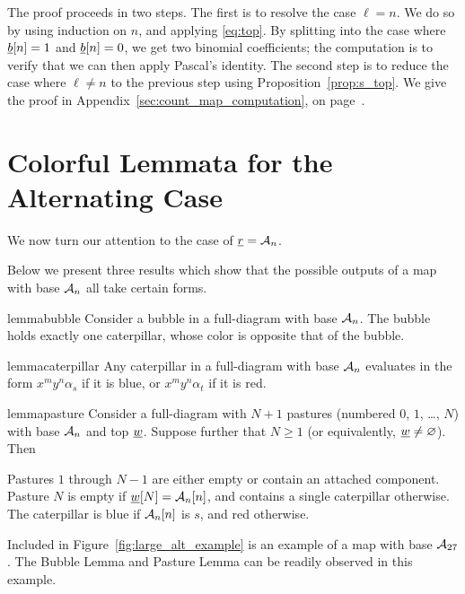 The proof proceeds in two steps.  The first is to resolve the case $\ell = n$.  We do so by using induction on $n$, and applying \eqref{eq:top}.  By splitting into the case where $\ul b[n] = 1$ and $\ul b[n] = 0$, we get two binomial coefficients; the computation is to verify that we can then apply Pascal's identity.
The second step is to reduce the case where $\ell \neq n$ to the previous step using Proposition~\ref{prop:s_top}.  We give the proof in Appendix~\ref{sec:count_map_computation}, on page~\pageref{sec:count_map_computation}.

\section{Colorful Lemmata for the Alternating Case}
\label{sec:res_alt_restrict}
We now turn our attention to the case of $\ul r = \AA_n$.

Below we present three results which show that the possible outputs of a map with base $\AA_n$ all take certain forms.
\begin{restatable}{lemma}{bubble}
	Consider a bubble in a full-diagram with base $\AA_n$.  The bubble holds exactly one caterpillar, whose color is opposite that of the bubble.
	\label{thm:bubble}
\end{restatable}
\begin{restatable}{lemma}{caterpillar}
	Any caterpillar in a full-diagram with base $\AA_n$ evaluates in the form $x^my^n\alpha_s$ if it is blue, or $x^my^n\alpha_t$ if it is red.
	\label{thm:caterpillar}
\end{restatable}
\begin{restatable}{lemma}{pasture}
	Consider a full-diagram with $N+1$ pastures (numbered $0$, $1$, \dots, $N$) with base $\AA_n$ and top $\ul w$.  Suppose further that $N \ge 1$ (or equivalently, $\ul w \neq \varnothing$).  Then
	\begin{enumerate}[(i)]
		\ii Pastures $1$ through $N-1$ are either empty or contain an attached component.
		\ii Pasture $N$ is empty if $\ul w[N] = \AA_n[n]$, and contains a single caterpillar otherwise.  The caterpillar is blue if $\AA_n[n]$ is $s$, and red otherwise.
	\end{enumerate}
	\label{thm:pasture}
\end{restatable}

Included in Figure~\ref{fig:large_alt_example} is an example of a map with base $\AA_{27}$.   The Bubble Lemma and Pasture Lemma can be readily observed in this example.

